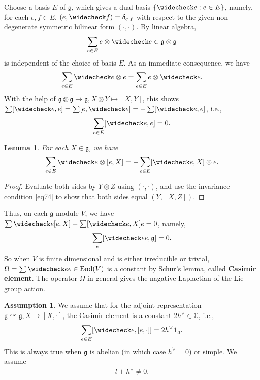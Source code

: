 \documentclass[12pt,a4paper,notitlepage]{article}
\theoremstyle{definition}
\newtheorem{ass}[df]{Assumption}
\theoremstyle{plain}
\newtheorem{lm}[df]{Lemma}
\newcommand{\wch}{\widecheck}
\newcommand{\End}{\mathrm{End}} %
\newcommand{\id}{\mathbf{1}}
\newcommand{\gk}{\mathfrak g}
\newcommand{\Cbb}{\mathbb C}
\numberwithin{equation}{section}
\begin{document}
Choose a basis $E$ of $\gk$, which gives a dual basis $\{\wch e:e\in E\}$, namely, for each $e,f\in E$, $(e,\wch f)=\delta_{e,f}$ with respect to the given non-degenerate symmetric bilinear form $(\cdot,\cdot)$. By linear algebra,
\begin{align}
\sum_{e\in E}e\otimes \wch e\in\gk\otimes \gk	
\end{align}
is independent of the choice of basis $E$. As an immediate consequence, we have
\begin{align}
\sum_{e\in E} \wch e\otimes e=\sum_{e\in E} e\otimes\wch e.\label{eq77}
\end{align}
With the help of $\gk\otimes\gk\rightarrow \gk,X\otimes Y\mapsto[X,Y]$, this shows $\sum[\wch e,e]=\sum[e,\wch e]=-\sum[\wch e,e]$, i.e.,
\begin{align}
\sum_{e\in E}[\wch e,e]=0.\label{eq81}
\end{align}
\begin{lm}\label{lb50}
For each $X\in\gk$, we have
\begin{align}
	\sum_{e\in E}\wch e\otimes [e,X]=-\sum_{e\in E}[\wch e,X]\otimes e.
\end{align}
\end{lm}
\begin{proof}
Evaluate both sides by $Y\otimes Z$ using $(\cdot,\cdot)$, and use the invariance condition \eqref{eq74} to show that both sides equal $(Y,[X,Z])$.
\end{proof}
Thus, on each $\gk$-module $V$, we have $\sum \wch e[e,X]+\sum [\wch e,X]e=0$, namely,
\begin{align}
\sum_e [\wch ee,\gk]=0.	
\end{align}
So when $V$ is finite dimensional and  is either irreducible or trivial, $\Omega=\sum \wch ee\in\End(V)$ is a constant by Schur's lemma, called \textbf{Casimir element}. The operator $\Omega$ in general gives the nagative Laplactian of the Lie group action.

\begin{ass}\label{lb52}
We assume that for the adjoint representation $\gk\curvearrowright\gk,X\mapsto [X,\cdot]$, the Casimir element is a constant $2h^\vee\in\Cbb$, i.e., 
\begin{align}
\sum_{e\in E}[\wch e,[e,\cdot]]=2h^\vee\id_\gk.	
\end{align}
This is always true when $\gk$ is abelian (in which case $h^\vee=0$) or simple. We assume
\begin{align*}
	l+h^\vee\neq0.
\end{align*}
\end{ass}
\end{document}
